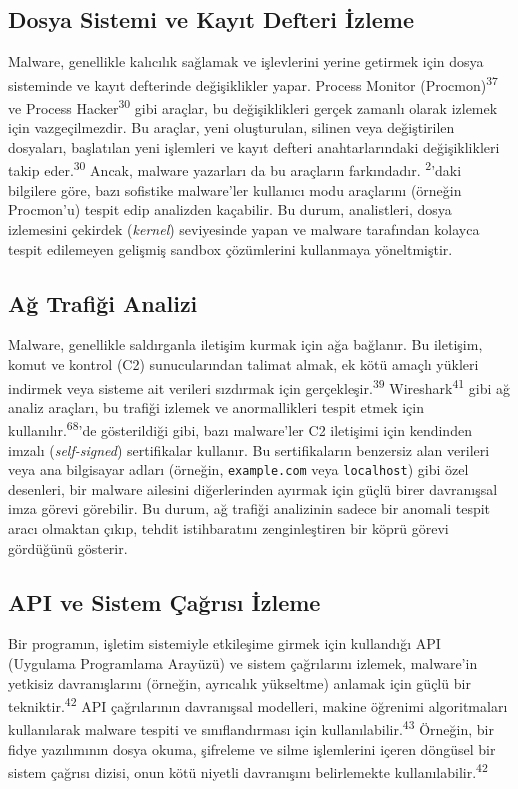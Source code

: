 \subsection{Dosya Sistemi ve Kayıt Defteri İzleme}

Malware, genellikle kalıcılık sağlamak ve işlevlerini yerine getirmek için dosya sisteminde ve kayıt defterinde değişiklikler yapar. Process Monitor (Procmon)\textsuperscript{37} ve Process Hacker\textsuperscript{30} gibi araçlar, bu değişiklikleri gerçek zamanlı olarak izlemek için vazgeçilmezdir. Bu araçlar, yeni oluşturulan, silinen veya değiştirilen dosyaları, başlatılan yeni işlemleri ve kayıt defteri anahtarlarındaki değişiklikleri takip eder.\textsuperscript{30} Ancak, malware yazarları da bu araçların farkındadır. \textsuperscript{2}'daki bilgilere göre, bazı sofistike malware'ler kullanıcı modu araçlarını (örneğin Procmon'u) tespit edip analizden kaçabilir. Bu durum, analistleri, dosya izlemesini çekirdek (\textit{kernel}) seviyesinde yapan ve malware tarafından kolayca tespit edilemeyen gelişmiş sandbox çözümlerini kullanmaya yöneltmiştir.

\subsection{Ağ Trafiği Analizi}

Malware, genellikle saldırganla iletişim kurmak için ağa bağlanır. Bu iletişim, komut ve kontrol (C2) sunucularından talimat almak, ek kötü amaçlı yükleri indirmek veya sisteme ait verileri sızdırmak için gerçekleşir.\textsuperscript{39} Wireshark\textsuperscript{41} gibi ağ analiz araçları, bu trafiği izlemek ve anormallikleri tespit etmek için kullanılır.\textsuperscript{68}'de gösterildiği gibi, bazı malware'ler C2 iletişimi için kendinden imzalı (\textit{self-signed}) sertifikalar kullanır. Bu sertifikaların benzersiz alan verileri veya ana bilgisayar adları (örneğin, \texttt{example.com} veya \texttt{localhost}) gibi özel desenleri, bir malware ailesini diğerlerinden ayırmak için güçlü birer davranışsal imza görevi görebilir. Bu durum, ağ trafiği analizinin sadece bir anomali tespit aracı olmaktan çıkıp, tehdit istihbaratını zenginleştiren bir köprü görevi gördüğünü gösterir.

\subsection{API ve Sistem Çağrısı İzleme}

Bir programın, işletim sistemiyle etkileşime girmek için kullandığı API (Uygulama Programlama Arayüzü) ve sistem çağrılarını izlemek, malware'in yetkisiz davranışlarını (örneğin, ayrıcalık yükseltme) anlamak için güçlü bir tekniktir.\textsuperscript{42} API çağrılarının davranışsal modelleri, makine öğrenimi algoritmaları kullanılarak malware tespiti ve sınıflandırması için kullanılabilir.\textsuperscript{43} Örneğin, bir fidye yazılımının dosya okuma, şifreleme ve silme işlemlerini içeren döngüsel bir sistem çağrısı dizisi, onun kötü niyetli davranışını belirlemekte kullanılabilir.\textsuperscript{42}


